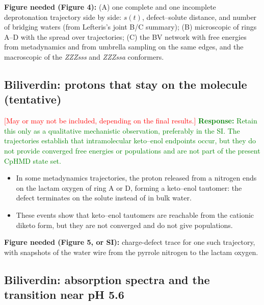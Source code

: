 \noindent\textbf{Figure needed (Figure 4):} (A) one complete and one incomplete deprotonation trajectory side by side: $s(t)$, defect--solute distance, and number of bridging waters (from Lefteris's joint B/C summary); (B) microscopic \pka{} of rings A--D with the spread over trajectories; (C) the BV network with free energies from metadynamics and from umbrella sampling on the same edges, and the macroscopic \pka{} of the \textit{ZZZsss} and \textit{ZZZssa} conformers.

\subsection{Biliverdin: protons that stay on the molecule (tentative)}
\textcolor{red}{[May or may not be included, depending on the final results.]}
\textcolor{green}{\textbf{Response:} Retain this only as a qualitative mechanistic observation, preferably in the SI. The trajectories establish that intramolecular keto--enol endpoints occur, but they do not provide converged free energies or populations and are not part of the present CpHMD state set.}

\begin{itemize}
\item In some metadynamics trajectories, the proton released from a nitrogen ends on the lactam oxygen of ring A or D, forming a keto--enol tautomer: the defect terminates on the solute instead of in bulk water.
\item These events show that keto--enol tautomers are reachable from the cationic diketo form, but they are not converged and do not give populations.
\end{itemize}

\noindent\textbf{Figure needed (Figure 5, or SI):} charge-defect trace for one such trajectory, with snapshots of the water wire from the pyrrole nitrogen to the lactam oxygen.

\subsection{Biliverdin: absorption spectra and the transition near pH 5.6}

